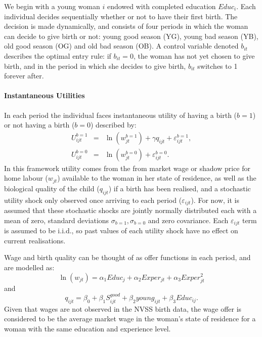 \documentclass[a4paper, 11 pt]{article}
\theoremstyle{plain}
\begin{document}
\begin{spacing}{1.4}
We begin with a young woman $i$ endowed with completed education $Educ_i$.  Each
individual decides sequentially whether or not to have their first birth.  The 
decision is made dynamically, and consists of four periods in which the woman 
can decide to give birth or not: young good season (YG), young bad season (YB), 
old good season (OG) and old bad season (OB). A control variable denoted $b_{it}$ 
describes the optimal entry rule: if $b_{it}=0$, the woman has not yet chosen to 
give birth, and in the period in which she decides to give birth, $b_{it}$ 
switches to 1 forever after. 

\paragraph{Instantaneous Utilities}
In each period the individual faces instantaneous utility of having a birth
($b=1$) or not having a birth ($b=0$) described by:
\begin{eqnarray}
U_{ijt}^{b=1}&=&\ln(w_{jt}^{b=1}) + \gamma q_{ijt} + \varepsilon^{b=1}_{ijt}, \nonumber \\
U_{ijt}^{b=0}&=&\ln(w_{jt}^{b=0}) + \varepsilon^{b=0}_{ijt}. \nonumber 
\end{eqnarray}
In this framework utility comes from the from market wage or shadow price for 
home labour ($w_{jt}$) available to the woman in her state of residence, as well 
as the biological quality of the child ($q_{ijt}$) if a birth has been realised, 
and a stochastic utility shock only observed once arriving to each period 
($\varepsilon_{ijt}$).  For now, it is assumed that these stochastic shocks are 
jointly normally distributed each with a mean of zero, standard deviations 
$\sigma_{b=1},\sigma_{b=0}$ and zero covariance.  Each $\varepsilon_{ijt}$ term 
is assumed to be i.i.d., so past values of each utility shock have no effect on 
current realisations.

Wage and birth quality can be thought of as offer functions in each period, and 
are modelled as:
\[
\ln(w_{jt})=\alpha_1 Educ_{j} + \alpha_2 Exper_{jt} + \alpha_3 Exper_{jt}^2
\]
and
\[
q_{ijt} = \beta_0 + \beta_1 S^{good}_{ijt} + \beta_2 young_{ijt} + \beta_3 Educ_{ij}.
\]
Given that wages are not observed in the NVSS birth data, the wage offer is
considered to be the average market wage in the woman's state of residence for
a woman with the same education and experience level.


\end{spacing}
\end{document}
